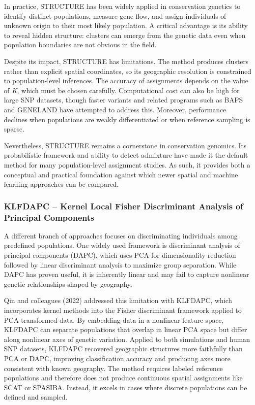 In practice, STRUCTURE has been widely applied in conservation genetics to identify distinct populations, measure gene flow, and assign individuals of unknown origin to their most likely population. A critical advantage is its ability to reveal hidden structure: clusters can emerge from the genetic data even when population boundaries are not obvious in the field.

Despite its impact, STRUCTURE has limitations. The method produces clusters rather than explicit spatial coordinates, so its geographic resolution is constrained to population-level inferences. The accuracy of assignments depends on the value of \textit{K}, which must be chosen carefully. Computational cost can also be high for large SNP datasets, though faster variants and related programs such as BAPS and GENELAND have attempted to address this. Moreover, performance declines when populations are weakly differentiated or when reference sampling is sparse.

Nevertheless, STRUCTURE remains a cornerstone in conservation genomics. Its probabilistic framework and ability to detect admixture have made it the default method for many population-level assignment studies. As such, it provides both a conceptual and practical foundation against which newer spatial and machine learning approaches can be compared.

\subsubsection{KLFDAPC – Kernel Local Fisher Discriminant Analysis of Principal Components}

A different branch of approaches focuses on discriminating individuals among predefined populations. One widely used framework is discriminant analysis of principal components (DAPC), which uses PCA for dimensionality reduction followed by linear discriminant analysis to maximize group separation. While DAPC has proven useful, it is inherently linear and may fail to capture nonlinear genetic relationships shaped by geography.

Qin and colleagues (2022) \cite{qin2022klfdapc} addressed this limitation with KLFDAPC, which incorporates kernel methods into the Fisher discriminant framework applied to PCA-transformed data. By embedding data in a nonlinear feature space, KLFDAPC can separate populations that overlap in linear PCA space but differ along nonlinear axes of genetic variation. Applied to both simulations and human SNP datasets, KLFDAPC recovered geographic structures more faithfully than PCA or DAPC, improving classification accuracy and producing axes more consistent with known geography. The method requires labeled reference populations and therefore does not produce continuous spatial assignments like SCAT or SPASIBA. Instead, it excels in cases where discrete populations can be defined and sampled.

